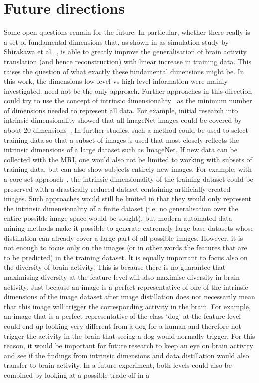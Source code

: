 \section{Future directions}

Some open questions remain for the future. In particular, whether there really is a set of fundamental dimensions that, as shown in as simulation study by Shirakawa et al.~\cite{shirakawaSpuriousReconstructionBrain2024}, is able to greatly improve the generalisation of brain activity translation (and hence reconstruction) with linear increase in training data. This raises the question of what exactly these fundamental dimensions might be. In this work, the dimensions low-level vs high-level information were mainly investigated.  need not be the only approach. Further approaches in this direction could try to use the concept of intrinsic dimensionality~\cite{bennettIntrinsicDimensionalitySignal1969} as the minimum number of dimensions needed to represent all data. For example, initial research into intrinsic dimensionality showed that all ImageNet images could be covered by about 20 dimensions~\cite{popeIntrinsicDimensionImages2021}. In further studies, such a method could be used to select training data so that a subset of images is used that most closely reflects the intrinsic dimensions of a large dataset such as ImageNet. If new data can be collected with the MRI, one would also not be limited to working with subsets of training data, but can also show subjects entirely new images. For example, with a core-set approach~\cite{nguyenDatasetDistillationInfinitely2021,wangDatasetDistillation2018}, the intrinsic dimensionality of the training dataset could be preserved with a drastically reduced dataset containing artificially created images. Such approaches would still be limited in that they would only represent the intrinsic dimensionality of a finite dataset (i.e. no generalisation over the entire possible image space would be sought), but modern automated data mining methods make it possible to generate extremely large base datasets whose distillation can already cover a large part of all possible images. However, it is not enough to focus only on the images (or in other words the features that are to be predicted) in the training dataset. It is equally important to focus also on the diversity of brain activity. This is because there is no guarantee that maximising diversity at the feature level will also maximise diversity in brain activity. Just because an image is a perfect representative of one of the intrinsic dimensions of the image dataset after image distillation does not necessarily mean that this image will trigger the corresponding activity in the brain. For example, an image that is a perfect representative of the class `dog' at the feature level could end up looking very different from a dog for a human and therefore not trigger the activity in the brain that seeing a dog would normally trigger. For this reason, it would be important for future research to keep an eye on brain activity and see if the findings from intrinsic dimensions and data distillation would also transfer to brain activity. In a future experiment, both levels could also be combined by looking at  a possible trade-off in a 